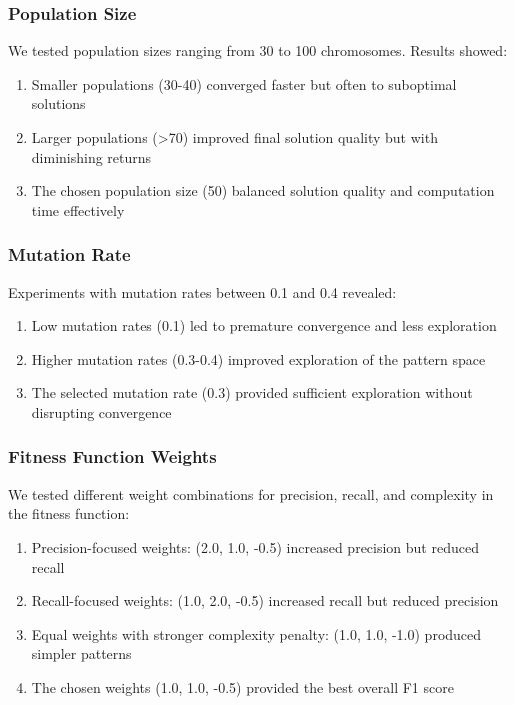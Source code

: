 \documentclass[conference]{IEEEtran}
\begin{document}
\subsubsection{\textbf{Population Size}}
We tested population sizes ranging from 30 to 100 chromosomes. Results showed:
\begin{enumerate}
\item Smaller populations (30-40) converged faster but often to suboptimal solutions
\item Larger populations (>70) improved final solution quality but with diminishing returns
\item The chosen population size (50) balanced solution quality and computation time effectively
\end{enumerate}

\subsubsection{\textbf{Mutation Rate}}
Experiments with mutation rates between 0.1 and 0.4 revealed:
\begin{enumerate}
\item Low mutation rates (0.1) led to premature convergence and less exploration
\item Higher mutation rates (0.3-0.4) improved exploration of the pattern space
\item The selected mutation rate (0.3) provided sufficient exploration without disrupting convergence
\end{enumerate}

\subsubsection{\textbf{Fitness Function Weights}}
We tested different weight combinations for precision, recall, and complexity in the fitness function:
\begin{enumerate}
\item Precision-focused weights: (2.0, 1.0, -0.5) increased precision but reduced recall
\item Recall-focused weights: (1.0, 2.0, -0.5) increased recall but reduced precision
\item Equal weights with stronger complexity penalty: (1.0, 1.0, -1.0) produced simpler patterns
\item The chosen weights (1.0, 1.0, -0.5) provided the best overall F1 score
\end{enumerate}
\end{document}
